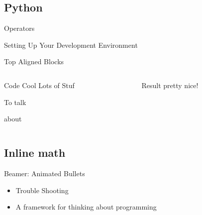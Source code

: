 \documentclass[presentation]{beamer}
\begin{document}
\subsection{Python}
\label{sec-7-1}
\begin{frame}[label=sec-7-1-1]{Operators}
\end{frame}

\begin{frame}[label=sec-7-1-2]{Setting Up Your Development Environment}
\end{frame}



\begin{frame}[label=sec-8-0-1]{Top Aligned Blocks}
\begin{columns}
\begin{column}{0.5\textwidth}
\begin{block}{Code}
Cool
Lots
of Stuf

To talk

about
\end{block}
\end{column}

\begin{column}{0.5\textwidth}
\begin{block}{Result}
pretty nice!
\end{block}
\end{column}
\end{columns}
\end{frame}


\subsection{Inline math}
\label{sec-8-1}


\begin{frame}[label=sec-8-1-1]{Beamer: Animated Bullets}
\begin{itemize}[<+->]
\item Trouble Shooting
\item A framework for thinking about programming
\end{itemize}
\end{frame}
\end{document}
